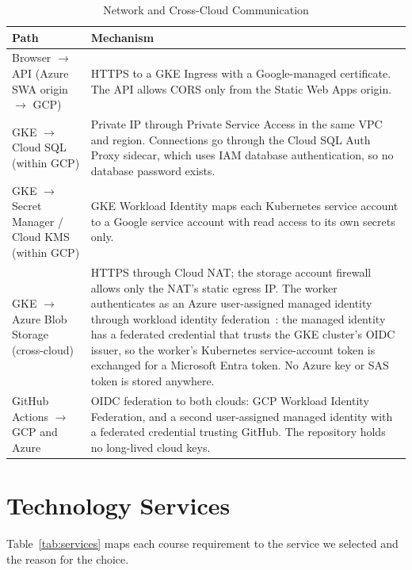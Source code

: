\documentclass[conference]{IEEEtran}
\begin{document}
\begin{table}[!t]
\caption{Network and Cross-Cloud Communication}
\label{tab:network}
\centering
\footnotesize
\begin{tabularx}{\columnwidth}{@{}L{2.2cm}Y@{}}
\toprule
\textbf{Path} & \textbf{Mechanism} \\
\midrule
Browser $\rightarrow$ API (Azure SWA origin $\rightarrow$ GCP) & HTTPS to a GKE Ingress with a Google-managed certificate. The API allows CORS only from the Static Web Apps origin. \\
GKE $\rightarrow$ Cloud SQL (within GCP) & Private IP through Private Service Access in the same VPC and region. Connections go through the Cloud SQL Auth Proxy sidecar, which uses IAM database authentication, so no database password exists. \\
GKE $\rightarrow$ Secret Manager / Cloud KMS (within GCP) & GKE Workload Identity maps each Kubernetes service account to a Google service account with read access to its own secrets only. \\
GKE $\rightarrow$ Azure Blob Storage (cross-cloud) & HTTPS through Cloud NAT; the storage account firewall allows only the NAT's static egress IP. The worker authenticates as an Azure user-assigned managed identity through workload identity federation~\cite{entra-wif,uami-trust}: the managed identity has a federated credential that trusts the GKE cluster's OIDC issuer, so the worker's Kubernetes service-account token is exchanged for a Microsoft Entra token. No Azure key or SAS token is stored anywhere. \\
GitHub Actions $\rightarrow$ GCP and Azure & OIDC federation to both clouds: GCP Workload Identity Federation, and a second user-assigned managed identity with a federated credential trusting GitHub. The repository holds no long-lived cloud keys. \\
\bottomrule
\end{tabularx}
\end{table}

\section{Technology Services}
Table~\ref{tab:services} maps each course requirement to the service we selected and the reason for the choice.
\end{document}
